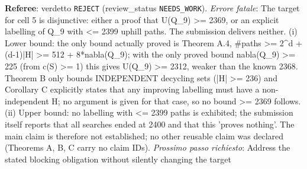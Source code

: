 \documentclass[11pt,a4paper]{article}
\begin{document}
\begin{description}
\textbf{Referee}: verdetto \texttt{REJECT} (review\_status \texttt{NEEDS\_WORK}).
\emph{Errore fatale}: The target for cell 5 is disjunctive: either a proof that U(Q\_9) \textgreater{}= 2369, or an explicit labelling of Q\_9 with \textless{}= 2399 uphill paths. The submission delivers neither. (i) Lower bound: the only bound actually proved is Theorem A.4, \#paths \textgreater{}= 2\textasciicircum{}d + (d-1)|H| \textgreater{}= 512 + 8*nabla(Q\_9); with the only proved bound nabla(Q\_9) \textgreater{}= 225 (from c(S) \textgreater{}= 1) this gives U(Q\_9) \textgreater{}= 2312, weaker than the known 2368. Theorem B only bounds INDEPENDENT decycling sets (|H| \textgreater{}= 236) and Corollary C explicitly states that any improving labelling must have a non-independent H; no argument is given for that case, so no bound \textgreater{}= 2369 follows. (ii) Upper bound: no labelling with \textless{}= 2399 paths is exhibited; the submission itself reports that all searches ended at 2400 and that this 'proves nothing'. The main claim is therefore not established; no other reusable claim was declared (Theorems A, B, C carry no claim IDs).
\emph{Prossimo passo richiesto}: Address the stated blocking obligation without silently changing the target
\end{description}
\end{document}

